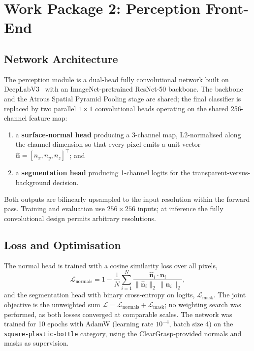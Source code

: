 \section{Work Package 2: Perception Front-End}
\label{sec:wp2}

\subsection{Network Architecture}
\label{subsec:architecture}

The perception module is a dual-head fully convolutional network built on DeepLabV3~\citep{chen2017rethinking} with an ImageNet-pretrained ResNet-50 backbone. The backbone and the Atrous Spatial Pyramid Pooling stage are shared; the final classifier is replaced by two parallel $1 \times 1$ convolutional heads operating on the shared 256-channel feature map:

\begin{enumerate}
    \item a \textbf{surface-normal head} producing a 3-channel map, L2-normalised along the channel dimension so that every pixel emits a unit vector $\hat{\mathbf{n}} = [n_x, n_y, n_z]^{\top}$; and
    \item a \textbf{segmentation head} producing 1-channel logits for the transparent-versus-background decision.
\end{enumerate}

Both outputs are bilinearly upsampled to the input resolution within the forward pass. Training and evaluation use $256 \times 256$ inputs; at inference the fully convolutional design permits arbitrary resolutions.

\subsection{Loss and Optimisation}
\label{subsec:loss}

The normal head is trained with a cosine similarity loss over all pixels,
\begin{equation}
    \mathcal{L}_{\mathrm{normals}} = 1 - \frac{1}{N} \sum_{i=1}^{N}
    \frac{\hat{\mathbf{n}}_i \cdot \mathbf{n}_i}{\lVert\hat{\mathbf{n}}_i\rVert_2\,\lVert\mathbf{n}_i\rVert_2},
\end{equation}
and the segmentation head with binary cross-entropy on logits, $\mathcal{L}_{\mathrm{mask}}$. The joint objective is the unweighted sum $\mathcal{L} = \mathcal{L}_{\mathrm{normals}} + \mathcal{L}_{\mathrm{mask}}$; no weighting search was performed, as both losses converged at comparable scales. The network was trained for 10 epochs with AdamW (learning rate $10^{-4}$, batch size 4) on the \texttt{square-plastic-bottle} category, using the ClearGrasp-provided normals and masks as supervision.

